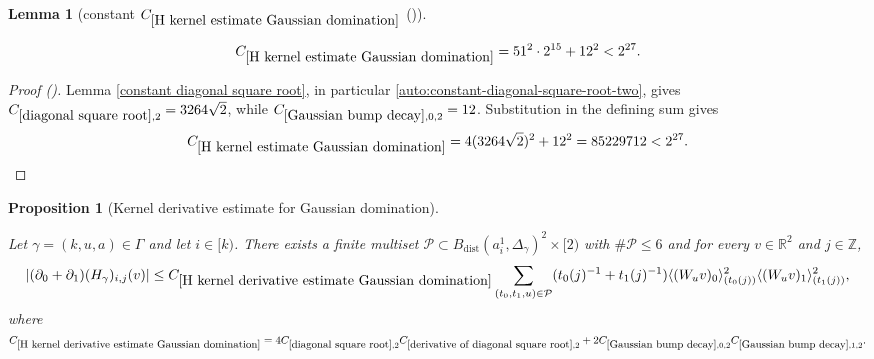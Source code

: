\documentclass[12pt,reqno]{amsart}
\newcommand{\auto}{{({\tiny\faCar})}}
\theoremstyle{plain}
\newtheorem{lemma}[theorem]{Lemma}
\newtheorem{proposition}[theorem]{Proposition}
\numberwithin{equation}{section}
\theoremstyle{remark}
\newcommand{\uses}[1]{}
\newcommand{\usesdefs}[1]{}
\newcommand{\leanok}{}
\newcommand{\lean}[1]{}
\newcommand{\Z}{{\mathbb Z}}
\newcommand{\R}{{\mathbb R}}
\begin{document}
\begin{lemma}[constant $C_{\ref{H kernel estimate Gaussian domination}}$ \auto]\label{constant H kernel estimate Gaussian domination}
\lean{Auto.constantHKernelEstimateGaussianDomination}
\leanok
\uses{constant diagonal square root,diagonal square root,Gaussian bump decay,H kernel estimate Gaussian domination}\usesdefs{}
\begin{equation}\label{constant H kernel estimate Gaussian domination bound}
C_{\ref{H kernel estimate Gaussian domination}}
=51^2\cdot2^{15}+12^2<2^{27}.
\end{equation}
\end{lemma}
\begin{proof}[Proof \auto]
Lemma \ref{constant diagonal square root}, in particular \eqref{auto:constant-diagonal-square-root-two}, gives
$C_{\ref{diagonal square root},2}=3264\sqrt2$, while
$C_{\ref{Gaussian bump decay},0,2}=12$. Substitution in the defining sum gives
\[
C_{\ref{H kernel estimate Gaussian domination}}
=4(3264\sqrt2)^2+12^2
=85229712<2^{27}.
\]
\end{proof}


\begin{proposition}[Kernel derivative estimate for Gaussian domination]\label{H kernel derivative estimate Gaussian domination}
\lean{Auto.hKernelDerivativeEstimateGaussianDomination}
\leanok
\uses{H kernel estimate Gaussian domination,diagonal square root,derivative of diagonal square root,Gaussian bump decay}\usesdefs{bracket bump,closed balls in A,geometric parameters,auto:unitary-matrices-definition,2D Gaussians,auto:Gaussian-difference-kernel-definition,s multiplier,H multiplier}
Let $\gamma=(k,u,a)\in \Gamma$ and let $i\in [k)$.
There exists a finite multiset $\mathcal{P}\subset B_{\mathrm{dist}}(a_i^1,\Delta_\gamma)^2\times [2)$ with $\#\mathcal{P}\le 6$ and for every $v\in \R^2$ and $j\in\Z$,
    \begin{equation}\label{auto:H-kernel-derivative-Gaussian-domination}|(\partial_0+\partial_1)(H_\gamma)_{i,j}(v)| \le C_{\ref{H kernel derivative estimate Gaussian domination}} \sum_{(t_0,t_1,u)\in\mathcal{P}} (t_0(j)^{-1} + t_1(j)^{-1}) \langle (W_u v)_0\rangle_{(t_0(j))}^2 \langle (W_u v)_1\rangle_{(t_1(j))}^2, \end{equation}
where $
C_{\ref{H kernel derivative estimate Gaussian domination}}
=
4C_{\ref{diagonal square root},2}
C_{\ref{derivative of diagonal square root},2}
+
2C_{\ref{Gaussian bump decay},0,2}
C_{\ref{Gaussian bump decay},1,2}.
$
\end{proposition}
\end{document}
